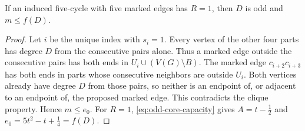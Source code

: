 \begin{lemma}\label{lem:odd-unit-slack}
If an induced five-cycle with five marked edges has $R=1$, then $D$ is odd and $m\leq f(D)$.
\end{lemma}

\begin{proof}
Let $i$ be the unique index with $s_i=1$. Every vertex of the other
four parts has degree $D$ from the consecutive pairs alone. Thus a
marked edge outside the consecutive pairs has both ends in
$U_i\cup(V(G)\setminus B)$. The marked edge $c_{i+2}c_{i+3}$ has both
ends in parts whose consecutive neighbors are outside $U_i$. Both
vertices already have degree $D$ from those pairs, so neither is
an endpoint of, or adjacent to an endpoint of, the proposed marked
edge. This contradicts the clique property. Hence $m\leq e_0$.
For $R=1$, \eqref{eq:odd-core-capacity} gives
$A=t-\frac{1}{2}$ and $e_0=5t^2-t+\frac{1}{4}=f(D)$.
\end{proof}
